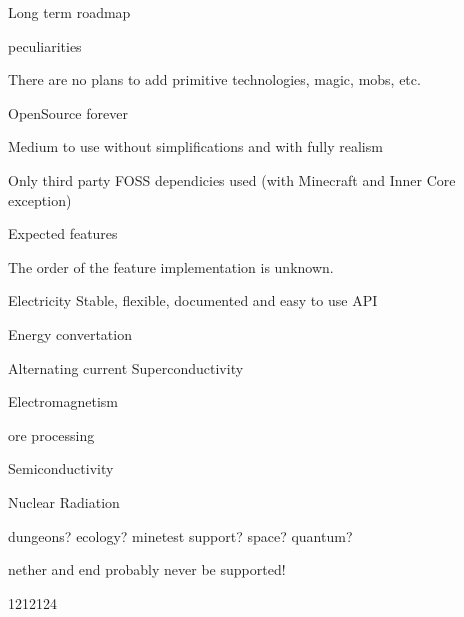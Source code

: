 Long term roadmap

peculiarities

There are no plans to add primitive technologies, magic, mobs, etc.

OpenSource forever

Medium to use without simplifications and with fully realism


Only third party FOSS dependicies used (with Minecraft and Inner Core exception)

Expected features

The order of the feature implementation is unknown.

Electricity
Stable, flexible, documented and easy to use API

Energy convertation

Alternating current
Superconductivity

Electromagnetism

ore processing

Semiconductivity

Nuclear
Radiation


dungeons?
ecology?
minetest support?
space?
quantum?

nether and end probably never be supported!


1212124